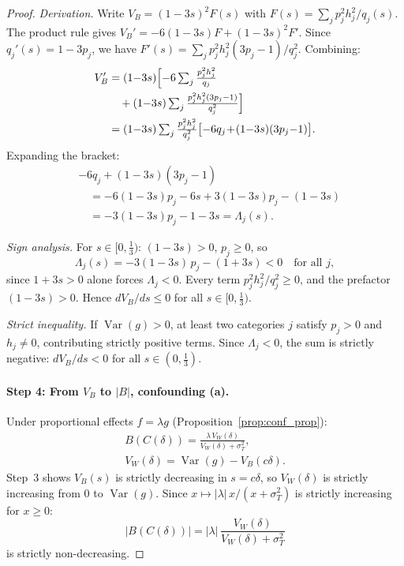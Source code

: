\begin{proof}
\emph{Derivation.}
Write $V_B=(1{-}3s)^2 F(s)$ with $F(s)=\sum_j p_j^2 h_j^2/q_j(s)$.
The product rule gives $V_B'=-6(1{-}3s)F+(1{-}3s)^2 F'$.
Since $q_j'(s)=1{-}3p_j$, we have $F'(s)=\sum_j p_j^2 h_j^2(3p_j{-}1)/q_j^2$.
Combining:
\begin{align*}
  V_B'
  &= (1{-}3s)\Bigl[-6\textstyle\sum_j \frac{p_j^2 h_j^2}{q_j}\\
  &\quad{}+(1{-}3s)\textstyle\sum_j \frac{p_j^2 h_j^2(3p_j{-}1)}{q_j^2}\Bigr] \\
  &= (1{-}3s)\textstyle\sum_j \frac{p_j^2 h_j^2}{q_j^2}\bigl[-6q_j\!+\!(1{-}3s)(3p_j{-}1)\bigr].
\end{align*}
Expanding the bracket:
\begin{align*}
  &-6q_j+(1{-}3s)(3p_j{-}1)\\
  &\quad= -6(1{-}3s)p_j-6s+3(1{-}3s)p_j-(1{-}3s)\\
  &\quad= -3(1{-}3s)p_j-1-3s
  = \Lambda_j(s).
\end{align*}

\emph{Sign analysis.}
For $s\in[0,\tfrac{1}{3})$: $(1{-}3s)>0$, $p_j\geq 0$, so
\[
  \Lambda_j(s) = -3(1{-}3s)\,p_j - (1+3s) < 0
  \quad\text{for all } j,
\]
since $1+3s>0$ alone forces $\Lambda_j<0$.
Every term $p_j^2 h_j^2/q_j^2\geq 0$, and the prefactor $(1{-}3s)>0$.
Hence $dV_B/ds\leq 0$ for all $s\in[0,\tfrac{1}{3})$.

\emph{Strict inequality.}
If $\operatorname{Var}(g){>}0$, at least two categories $j$ satisfy $p_j>0$ and $h_j\neq 0$, contributing strictly positive terms.
Since $\Lambda_j<0$, the sum is strictly negative:
$dV_B/ds<0$ for all $s\in(0,\tfrac{1}{3})$.

\paragraph{Step 4: From $V_B$ to $|B|$, confounding (a).}
Under proportional effects $f=\lambda g$ (Proposition~\ref{prop:conf_prop}):
\begin{gather*}
  B(C(\delta)) = \frac{\lambda\,V_W(\delta)}{V_W(\delta)+\sigma_T^2},\\
  V_W(\delta)=\operatorname{Var}(g)-V_B(c\delta).
\end{gather*}
Step~3 shows $V_B(s)$ is strictly decreasing in $s=c\delta$, so $V_W(\delta)$ is strictly increasing from $0$ to $\operatorname{Var}(g)$.
Since $x\mapsto |\lambda|\,x/(x+\sigma_T^2)$ is strictly increasing for $x\geq 0$:
\[
  |B(C(\delta))| = |\lambda|\,\frac{V_W(\delta)}{V_W(\delta)+\sigma_T^2}
\]
is strictly non-decreasing.


\end{proof}

